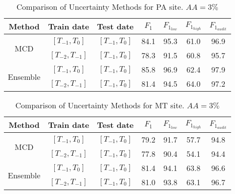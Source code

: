 \begin{table*}[ht!]
\caption{Comparison of Uncertainty Methods for PA site. $AA=3\%$}
\centering
\begin{tabular}{c|cc|c|ccc}
\hline
\textbf{Method}             & \textbf{Train  date} & \textbf{Test date} & $F_1$ & \textbf{$F_{1_{low}}$} & \textbf{$F_{1_{high}}$} & \textbf{$F_{1_{audit}}$} \\ \hline
\multirow{2}{*}{MCD} & $[T_{-1}, T_0]$                   & $[T_{-1}, T_0]$                 & 84.1        & 95.3                 & 61.0                  & 96.9                     \\
                            & $[T_{-2}, T_{-1}]$                   & $[T_{-1}, T_0]$                 & 78.3        & 91.5                 & 60.8                  & 95.7                   \\ \hline
\multirow{2}{*}{Ensemble}   & $[T_{-1}, T_0]$                   & $[T_{-1}, T_0]$                 & 85.8        & 96.9                 & 62.4                  & 97.9                   \\
                            & $[T_{-2}, T_{-1}]$                   & $[T_{-1}, T_0]$                 & 81.4        & 94.5                 & 64.0                  & 97.2                  
\end{tabular}
\label{tab:PA_comparison}
\end{table*}


\begin{table*}[ht!]
\caption{Comparison of Uncertainty Methods for MT site. $AA=3\%$}
\centering
\begin{tabular}{c|cc|c|ccc}
\hline
\textbf{Method}             & \textbf{Train  date} & \textbf{Test date} & $F_1$ & \textbf{$F_{1_{low}}$} & \textbf{$F_{1_{high}}$} & \textbf{$F_{1_{audit}}$} \\ \hline
\multirow{2}{*}{MCD} & $[T_{-1}, T_0]$                   & $[T_{-1}, T_0]$                 & 79.2        & 91.7                 & 57.7                  & 94.8                     \\
                            & $[T_{-2}, T_{-1}]$                   & $[T_{-1}, T_0]$                 & 77.8        & 90.4                 & 54.1                  & 94.4                   \\ \hline
\multirow{2}{*}{Ensemble}   & $[T_{-1}, T_0]$                   & $[T_{-1}, T_0]$                 & 81.4        & 94.1                 & 63.8                  & 96.6                   \\
                            & $[T_{-2}, T_{-1}]$                   & $[T_{-1}, T_0]$                 & 81.0        & 93.8                 & 63.1                  & 96.7                  
\end{tabular}
\label{tab:MT_comparison}
\end{table*}
\fi



